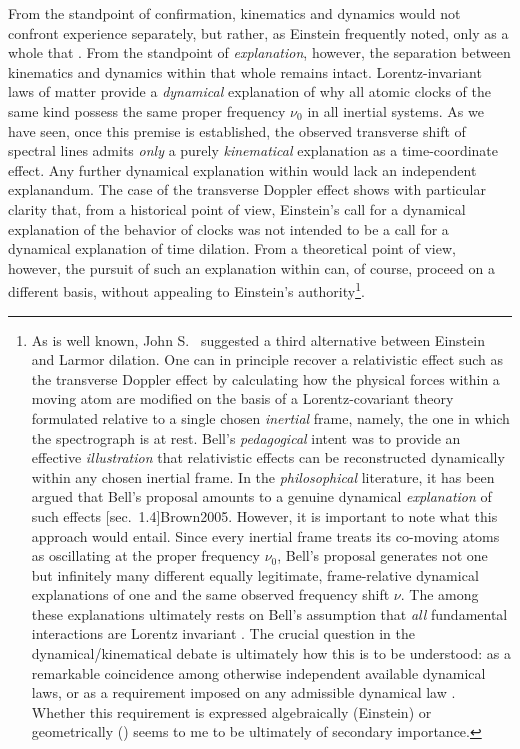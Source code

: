 \documentclass[submitted,12pt]{article}
\newcommand{\tDe}{transverse Doppler effect\xspace}
\begin{document}
From the standpoint of confirmation, kinematics and dynamics would not confront experience separately, but rather, as Einstein frequently noted, only as a whole that  \citep[678]{Einstein1949a}. From the standpoint of \emph{explanation}, however, the separation between kinematics and dynamics within that whole remains intact. Lorentz-invariant laws of matter provide a \emph{dynamical} explanation of why all atomic clocks of the same kind possess the same proper frequency $\nu_0$ in all inertial systems. As we have seen, once this premise is established, the observed transverse shift of spectral lines admits \emph{only} a purely \emph{kinematical} explanation as a time-coordinate effect. Any further dynamical explanation within \sr would lack an independent explanandum. The case of the \tDe shows with particular clarity that, from a historical point of view, Einstein’s call for a dynamical explanation of the behavior of clocks was not intended to be a call for a dynamical explanation of time dilation. From a theoretical point of view, however, the pursuit of such an explanation within \sr can, of course, proceed on a different basis, without appealing to Einstein’s authority\footnote{As is well known, John S.~\citet{Bell1976} suggested a third alternative between Einstein and Larmor dilation. One can in principle recover a relativistic effect such as the \tDe by calculating how the physical forces within a moving atom are modified on the basis of a Lorentz-covariant theory formulated relative to a single chosen \emph{inertial} frame, namely, the one in which the spectrograph is at rest. Bell's \emph{pedagogical} intent was to provide an effective \emph{illustration} that relativistic effects can be reconstructed dynamically within any chosen inertial frame. In the \emph{philosophical} literature, it has been argued that Bell's proposal amounts to a genuine dynamical \emph{explanation} of such effects [sec.~1.4]{Brown2005}. However, it is important to note what this approach would entail. Since every inertial frame treats its co-moving atoms as oscillating at the proper frequency $\nu_0$, Bell's proposal generates not one but infinitely many different equally legitimate, frame-relative dynamical explanations of one and the same observed frequency shift $\nu$. The  among these explanations ultimately rests on Bell's assumption that \emph{all} fundamental interactions are Lorentz invariant \citep[143]{Bell1976}. The crucial question in the dynamical/kinematical debate is ultimately how this  is to be understood: as a remarkable coincidence among otherwise independent available dynamical laws, or as a requirement imposed on any admissible dynamical law \citep{Lange2016}. Whether this requirement is expressed algebraically (Einstein) or geometrically (\Mink) seems to me to be ultimately of secondary importance.}.



\citetrackerfalse

\printbibliography
\end{document}
